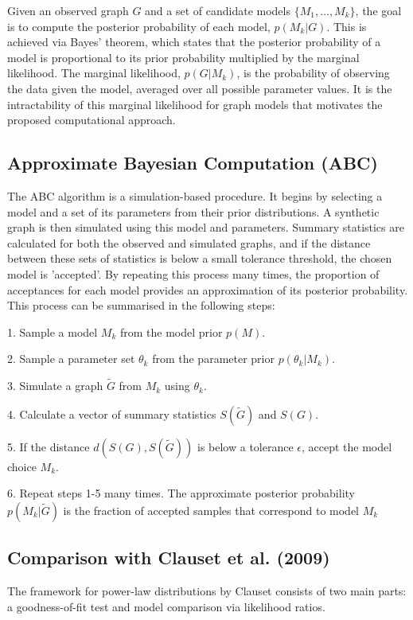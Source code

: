 \documentclass[stu,12pt,floatsintext]{apa7}
\begin{document}
Given an observed graph $G$ and a set of candidate models $\{M_1, \ldots, M_k\}$, the goal is to compute the posterior probability of each model, $p(M_k|G)$. This is achieved via Bayes' theorem, which states that the posterior probability of a model is proportional to its prior probability multiplied by the marginal likelihood. The marginal likelihood, $p(G|M_k)$, is the probability of observing the data given the model, averaged over all possible parameter values. It is the intractability of this marginal likelihood for graph models that motivates the proposed computational approach.

\subsection{Approximate Bayesian Computation (ABC)}

The ABC algorithm is a simulation-based procedure. It begins by selecting a model and a set of its parameters from their prior distributions. A synthetic graph is then simulated using this model and parameters. Summary statistics are calculated for both the observed and simulated graphs, and if the distance between these sets of statistics is below a small tolerance threshold, the chosen model is 'accepted'. By repeating this process many times, the proportion of acceptances for each model provides an approximation of its posterior probability. This process can be summarised in the following steps:

1. Sample a model $M_k$ from the model prior $p(M)$.

2. Sample a parameter set $\theta_k$ from the parameter prior $p(\theta_k|M_k)$.

3. Simulate a graph $\widetilde{G}$ from $M_k$ using $\theta_k$.

4. Calculate a vector of summary statistics $S(\widetilde{G})$ and $S(G)$.

5. If the distance $d(S(G), S(\widetilde{G}))$ is below a tolerance $\epsilon$, accept the model choice $M_k$.

6. Repeat steps 1-5 many times. The approximate posterior probability $p(M_k|\widetilde{G})$ is the fraction of accepted samples that correspond to model $M_k$


\subsection{Comparison with Clauset et al. (2009)}

The framework for power-law distributions by Clauset consists of two main parts: a goodness-of-fit test and model comparison via likelihood ratios.
\end{document}
